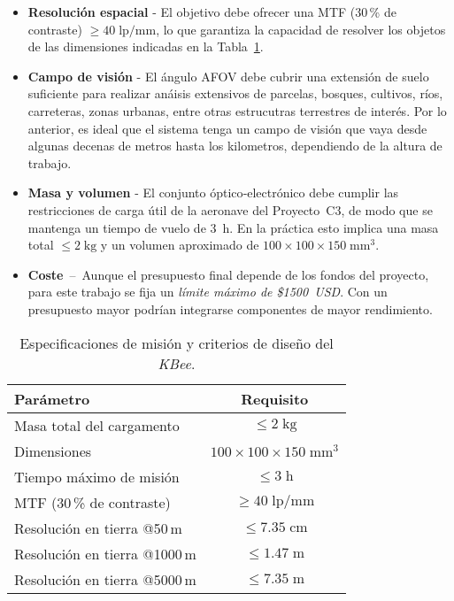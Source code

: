 \begin{itemize}
    \item \textbf{Resolución espacial} - El objetivo debe ofrecer una MTF (30\,\% de contraste) 
          \textbf{$\geq 40\;\text{lp/mm}$}, lo que garantiza la capacidad de resolver los objetos 
          de las dimensiones indicadas en la Tabla~\ref{tab:req_vs_obj}.
          
    \item \textbf{Campo de visión} - El ángulo AFOV debe cubrir una extensión de suelo suficiente para realizar anáisis extensivos de parcelas, bosques, cultivos, ríos, carreteras, zonas urbanas, entre otras estrucutras terrestres de interés. Por lo anterior, es ideal que el sistema tenga un campo de visión que vaya desde algunas decenas de metros hasta los kilometros, dependiendo de la altura de trabajo.
          
    \item \textbf{Masa y volumen} - El conjunto óptico‑electrónico debe cumplir las 
          restricciones de carga útil de la aeronave del Proyecto C3, 
          de modo que se mantenga un tiempo de vuelo de 3 h.  
          En la práctica esto implica una masa total $\leq 2\;\text{kg}$ 
          y un volumen aproximado de $100\times100\times150\;\text{mm}^{3}$.
          
    \item \textbf{Coste} – Aunque el presupuesto final depende de los fondos del proyecto, 
          para este trabajo se fija un \emph{límite máximo de \$1500 USD}.  
          Con un presupuesto mayor podrían integrarse componentes de mayor rendimiento.
\end{itemize}


\begin{table}[h]
  \centering
  \caption{Especificaciones de misión y criterios de diseño del \textit{KBee}.}
  \label{tab:req_vs_obj}
  \begin{tabular}{|p{4cm}|c|}
      \hline
      \rowcolor[HTML]{EFEFEF}\textbf{Parámetro} & \textbf{Requisito} \\ \hline
      Masa total del cargamento & $\leq 2\;\text{kg}$ \\ \hline
      Dimensiones & $100 \times 100 \times 150\;\text{mm}^{3}$ \\ \hline
      Tiempo máximo de misión & $\leq 3\;\text{h}$ \\ \hline
      MTF (30\,\% de contraste) & $\geq 40\;\text{lp/mm}$ \\ \hline
      Resolución en tierra @50\,m & $\leq 7.35\;\text{cm}$ \\ \hline
      Resolución en tierra @1000\,m & $\leq 1.47\;\text{m}$ \\ \hline
      Resolución en tierra @5000\,m & $\leq 7.35\;\text{m}$ \\ \hline
  \end{tabular}
\end{table}

